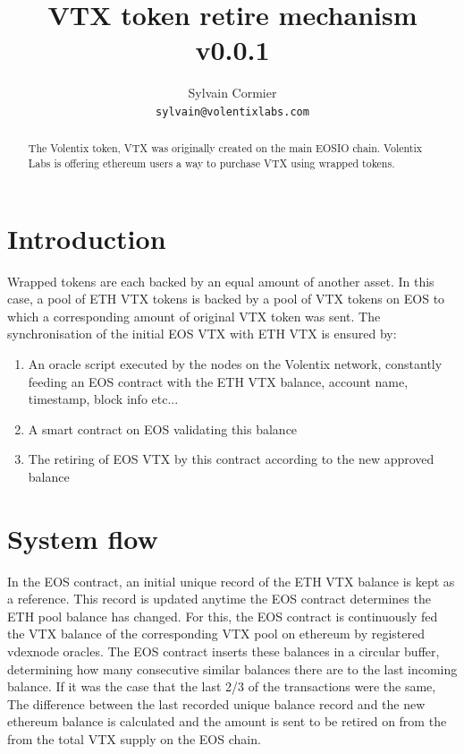 \documentclass[]{article}
\title{VTX token retire mechanism v0.0.1}
\author{
		Sylvain Cormier\\
	\texttt{sylvain@volentixlabs.com}
}
\begin{document}
\maketitle

\begin{abstract}

The Volentix token, VTX was originally created on the main EOSIO chain.
Volentix Labs is offering ethereum users a way to purchase VTX using wrapped tokens. 

\end{abstract}

\section{Introduction }
Wrapped tokens are each backed by an equal amount of another asset. In this case, a pool of ETH VTX tokens is backed by a pool of VTX tokens on EOS to which a corresponding amount of original VTX token was sent.
The synchronisation of the initial EOS VTX with ETH VTX is ensured by: 
	\begin{enumerate}
	\item An oracle script executed by the nodes on the Volentix network, constantly feeding an EOS contract with the ETH VTX balance, account name, timestamp, block info etc...
	\item A smart contract on EOS validating this balance 
	\item The retiring of EOS VTX by this contract according to the new approved balance
\end{enumerate}


\section{System flow}
In the EOS contract, an initial unique record of the ETH VTX balance is kept as a reference. This record is updated anytime the EOS contract determines the ETH pool balance has changed.
For this, the EOS contract is continuously fed the VTX balance of the corresponding VTX pool on ethereum by registered vdexnode oracles. The EOS contract inserts these balances in a circular buffer, determining how many consecutive similar balances there are to the last incoming balance. If it was the case that the last 2/3 of the transactions were the same, The difference between the last recorded unique balance record and the new ethereum balance is calculated and the amount is sent to be retired on from the from the total VTX supply on the EOS chain. 
 
\end{document}
